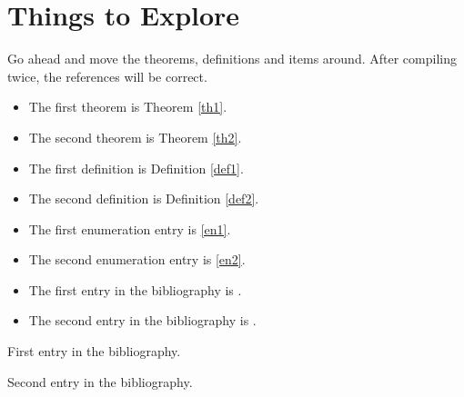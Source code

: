 \documentclass[12pt]{article}
\begin{document}
\section{Things to Explore}
\label{explore}

Go ahead and move the theorems, definitions and items around.
After compiling twice, the references will be correct.

\begin{itemize}
\item
The first theorem is Theorem \ref{th1}.

\item
The second theorem is Theorem \ref{th2}.

\item
The first definition is Definition \ref{def1}.

\item
The second definition is Definition \ref{def2}.

\item
The first enumeration entry is \ref{en1}.

\item
The second enumeration entry is \ref{en2}.


\item
The first entry in the bibliography is \cite{bib1}.

\item
The second entry in the bibliography is \cite{bib2}.

\end{itemize}



\begin{thebibliography}{99}
First entry in the bibliography.

Second entry in the bibliography.


\end{thebibliography}
\end{document}
